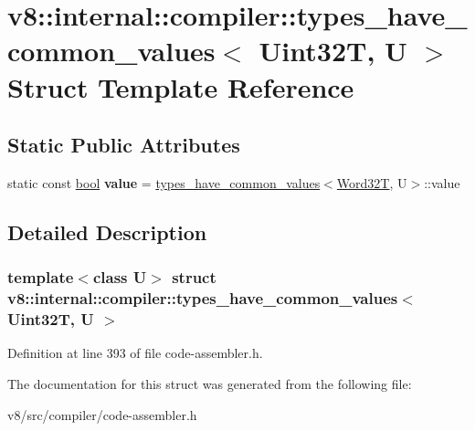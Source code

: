 \hypertarget{structv8_1_1internal_1_1compiler_1_1types__have__common__values_3_01Uint32T_00_01U_01_4}{}\section{v8\+:\+:internal\+:\+:compiler\+:\+:types\+\_\+have\+\_\+common\+\_\+values$<$ Uint32T, U $>$ Struct Template Reference}
\label{structv8_1_1internal_1_1compiler_1_1types__have__common__values_3_01Uint32T_00_01U_01_4}
\subsection*{Static Public Attributes}
\begin{DoxyCompactItemize}
\item 
\mbox{\label{structv8_1_1internal_1_1compiler_1_1types__have__common__values_3_01Uint32T_00_01U_01_4_a56b3bf7cde2e728f1ab9a3d23215a2b9}} 
static const \mbox{\hyperlink{classbool}{bool}} {\bfseries value} = \mbox{\hyperlink{structv8_1_1internal_1_1compiler_1_1types__have__common__values}{types\+\_\+have\+\_\+common\+\_\+values}}$<$\mbox{\hyperlink{structv8_1_1internal_1_1Word32T}{Word32T}}, U$>$\+::value
\end{DoxyCompactItemize}


\subsection{Detailed Description}
\subsubsection*{template$<$class U$>$\newline
struct v8\+::internal\+::compiler\+::types\+\_\+have\+\_\+common\+\_\+values$<$ Uint32\+T, U $>$}



Definition at line 393 of file code-\/assembler.\+h.



The documentation for this struct was generated from the following file\+:\begin{DoxyCompactItemize}
\item 
v8/src/compiler/code-\/assembler.\+h\end{DoxyCompactItemize}
